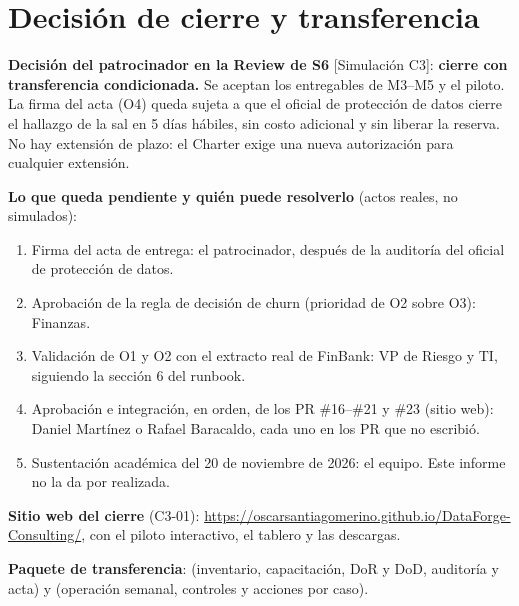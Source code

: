 \documentclass[10pt,a4paper]{article}
\newcommand{\rot}[1]{\textsf{\scriptsize\color{gris}[#1]}}
\begin{document}
\section{Decisión de cierre y transferencia}

\begin{tcolorbox}[colback=teal!6,colframe=teal!60,boxrule=0.5pt,arc=1mm]
\textbf{Decisión del patrocinador en la Review de S6} \rot{Simulación C3}: \textbf{cierre con transferencia condicionada.} Se aceptan los entregables de M3--M5 y el piloto. La firma del acta (O4) queda sujeta a que el oficial de protección de datos cierre el hallazgo de la sal en 5 días hábiles, sin costo adicional y sin liberar la reserva. No hay extensión de plazo: el Charter exige una nueva autorización para cualquier extensión.
\end{tcolorbox}

\textbf{Lo que queda pendiente y quién puede resolverlo} (actos reales, no simulados):
\begin{enumerate}
\item Firma del acta de entrega: el patrocinador, después de la auditoría del oficial de protección de datos.
\item Aprobación de la regla de decisión de churn (prioridad de O2 sobre O3): Finanzas.
\item Validación de O1 y O2 con el extracto real de FinBank: VP de Riesgo y TI, siguiendo la sección 6 del runbook.
\item Aprobación e integración, en orden, de los PR \#16--\#21 y \#23 (sitio web): Daniel Martínez o Rafael Baracaldo, cada uno en los PR que no escribió.
\item Sustentación académica del 20 de noviembre de 2026: el equipo. Este informe no la da por realizada.
\end{enumerate}

\textbf{Sitio web del cierre} (C3-01): \url{https://oscarsantiagomerino.github.io/DataForge-Consulting/}, con el piloto interactivo, el tablero y las descargas.

\textbf{Paquete de transferencia}:  (inventario, capacitación, DoR y DoD, auditoría y acta) y  (operación semanal, controles y acciones por caso).

\end{document}
